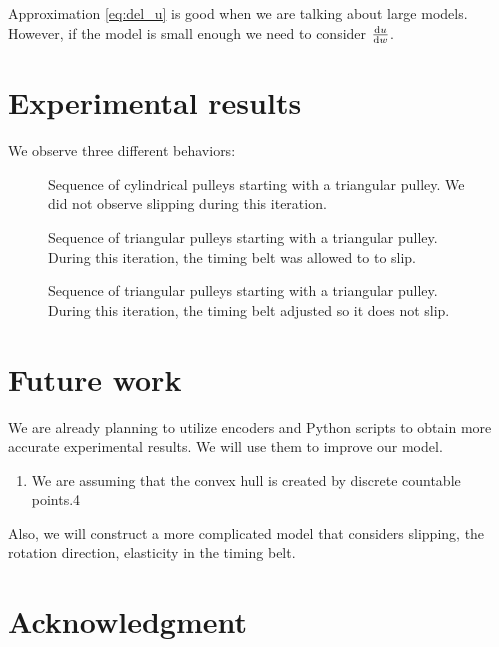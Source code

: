 \documentclass[conference]{IEEEtran}
\begin{document}
Approximation \ref{eq:del_u} is good when we are talking about large models. However, if the model is small enough we need to consider $\frac{\dif u}{\dif w}$.

\section{Experimental results}

We observe three different behaviors: 

\begin{figure}[htbp]
\caption{Sequence of cylindrical pulleys starting with a triangular pulley. We did not observe slipping during this iteration.}
\label{tri_circ}
\end{figure}

\begin{figure}[htbp]
\caption{Sequence of triangular pulleys starting with a triangular pulley. During this iteration, the timing belt was allowed to to slip.}
\label{tri_tri}
\end{figure}

\begin{figure}[htbp]
\caption{Sequence of triangular pulleys starting with a triangular pulley. During this iteration, the timing belt adjusted so it does not slip.}
\label{tri_tri_FB}
\end{figure}

\section*{Future work}

We are already planning to utilize encoders and Python scripts to obtain more accurate experimental results. We will use them to improve our model.\\
\begin{enumerate}

\item We are assuming that the convex hull is created by discrete countable points.4

\end{enumerate}
Also, we will construct a more complicated model that considers slipping, the rotation direction, elasticity in the timing belt.

\section*{Acknowledgment}

\appendix \label{appendix}

\begin{thebibliography}{00}
\end{thebibliography}
 
\end{document}
